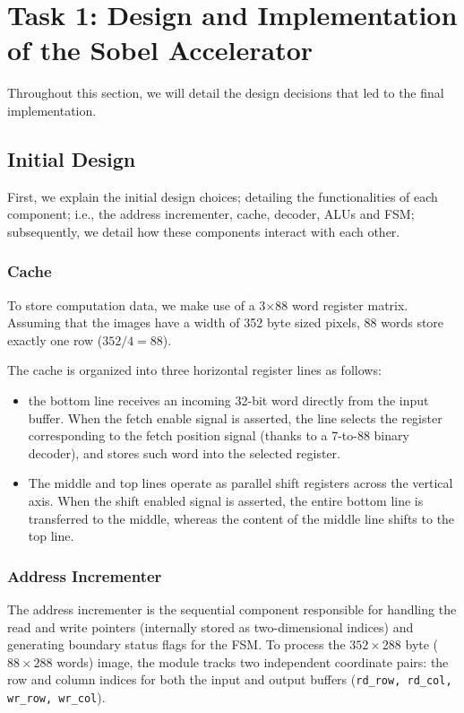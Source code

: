\section{Task 1: Design and Implementation of the Sobel Accelerator} \label{sec:task1}

Throughout this section, we will detail the design decisions that led to the final implementation. 

\subsection{Initial Design}

First, we explain the initial design choices; detailing the functionalities of each component; i.e., the address incrementer, cache, decoder, ALUs and FSM; subsequently, we detail how these components interact with each other.

\subsubsection{Cache}

To store computation data, we make use of a 3$\times$88 word register matrix. Assuming that the images have a width of 352 byte sized pixels, 88 words store exactly one row ($352/4=88$).

The cache is organized into three horizontal register lines as follows:
\begin{itemize}
    \item the bottom line receives an incoming 32-bit word directly from the input buffer. When the fetch enable signal is asserted, the line selects the register corresponding to the fetch position signal (thanks to a 7-to-88 binary decoder), and stores such word into the selected register.
    \item The middle and top lines operate as parallel shift registers across the vertical axis. When the shift enabled signal is asserted, the entire bottom line is transferred to the middle, whereas the content of the middle line shifts to the top line.
\end{itemize}

\subsubsection{Address Incrementer}

The address incrementer is the sequential component responsible for handling the read and write pointers (internally stored as two-dimensional indices) and generating boundary status flags for the FSM. To process the $352\times288$ byte ($88\times288$ words) image, the module tracks two independent coordinate pairs: the row and column indices for both the input and output buffers (\texttt{rd\_row, rd\_col, wr\_row, wr\_col}).


